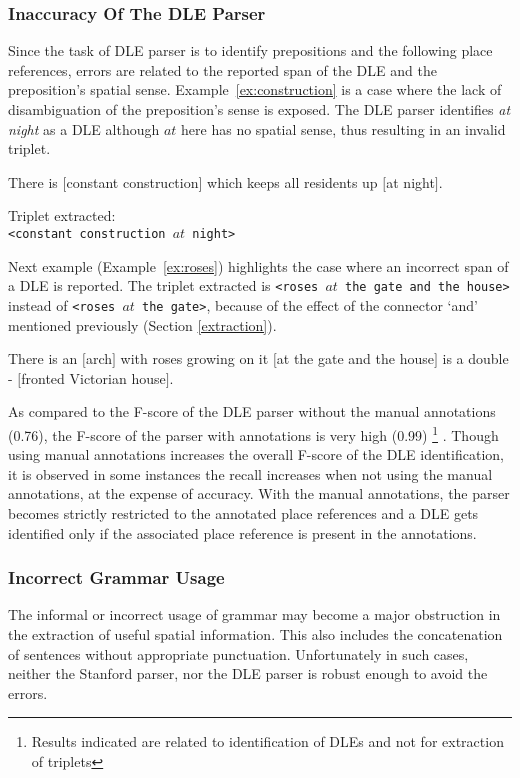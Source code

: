 \documentclass[letter]{sig-alternate}
\begin{document}
\subsubsection{Inaccuracy Of The DLE Parser}
Since the task of DLE parser is to identify prepositions and the following place references, errors are related to the reported span of the DLE and the preposition's spatial sense. Example~\ref{ex:construction} is a case where the lack of disambiguation of the preposition's sense is exposed. The DLE parser identifies \textit{at night} as a DLE although $at$ here has no spatial sense, thus resulting in an invalid triplet. 
\label{subsub:DLE}
\begin{example}
\label{ex:construction}
There is $[$constant construction$]$ which keeps all residents up $[$at night$]$. 
\end{example}
Triplet extracted:\\
\texttt{<constant construction $at$ night>}

Next example (Example~\ref{ex:roses}) highlights the case where an incorrect span of a DLE is reported. The triplet extracted is \texttt{<roses $at$ the gate and the house>} instead of \texttt{<roses $at$ the gate>}, because of the effect of the connector `and' mentioned previously (Section \ref{extraction}). 
\begin{example}
\label{ex:roses}
There is an $[$arch$]$ with roses growing on it $[$at the gate and the house$]$ is a double - $[$fronted Victorian house$]$.
\end{example}
As compared to the F-score of the DLE parser without the manual annotations (0.76), the F-score of the parser with annotations is very high (0.99) \footnote{Results indicated are related to identification of DLEs and not for extraction of triplets} \cite{fei:locative}.
Though using manual annotations increases the overall F-score of the DLE identification, it is observed in some instances the recall increases when not using the manual annotations, at the expense of accuracy. With the manual annotations, the parser becomes strictly restricted to the annotated place references and a DLE gets identified only if the associated place reference is present in the annotations. 
\subsubsection{Incorrect Grammar Usage}
The informal or incorrect usage of grammar may become a major obstruction in the extraction of useful spatial information. This also includes the concatenation of sentences without appropriate punctuation. Unfortunately in such cases, neither the Stanford parser, nor the DLE parser is robust enough to avoid the errors.
\end{document}
